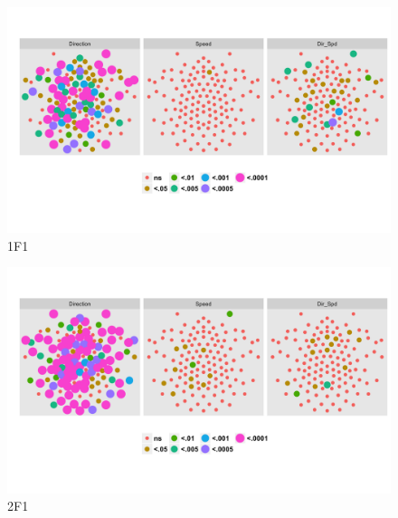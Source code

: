 \documentclass[landscape,final,paperwidth=72in,paperheight=42in,fontscale=0.285]{baposter}
\begin{document}
\begin{poster}
    {
\begin{figure}[H]
  \centering
  \includegraphics[scale=0.3]{../../figs/1F1/analyze-and-plot-main-effects-1.png}
  \caption{1F1}\label{analyze-and-plot-main-effects-1.png}
\end{figure}

\begin{figure}[H]
  \centering
  \includegraphics[scale=0.3]{../../figs/2F1/analyze-and-plot-main-effects-1.png}
  \caption{2F1}\label{analyze-and-plot-main-effects-1.png}
\end{figure}

}
\end{poster}
\end{document}
